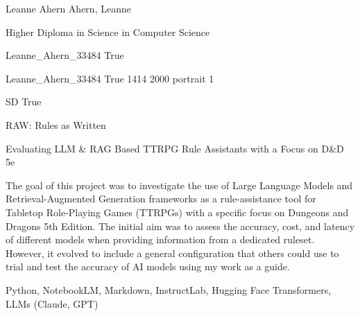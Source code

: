 \documentclass[twoside]{report}
\begin{document}
\begingroup{}\relax



\def\Key{Leanne_Ahern_33484}

{Leanne Ahern}
{Ahern, Leanne}

{Higher Diploma in Science in Computer Science}

{Leanne_Ahern_33484}
{True}

{Leanne_Ahern_33484}
{True}
{1414}
{2000}
{portrait}
{1}

{SD}
{True}

{RAW: Rules as Written}

{Evaluating LLM \& RAG Based TTRPG Rule Assistants with a Focus on D\&D 5e}

{The goal of this project was to investigate the use of Large Language Models and Retrieval-Augmented Generation frameworks as a rule-assistance tool for Tabletop Role-Playing Games (TTRPGs) with a specific focus on Dungeons and Dragons 5th Edition. The initial aim was to assess the accuracy, cost, and latency of different models when providing information from a dedicated ruleset. However, it evolved to include a general configuration that others could use to trial and test the accuracy of AI models using my work as a guide.}

{Python, NotebookLM, Markdown, InstructLab, Hugging Face Transformers, LLMs (Claude, GPT)}
\end{document}
